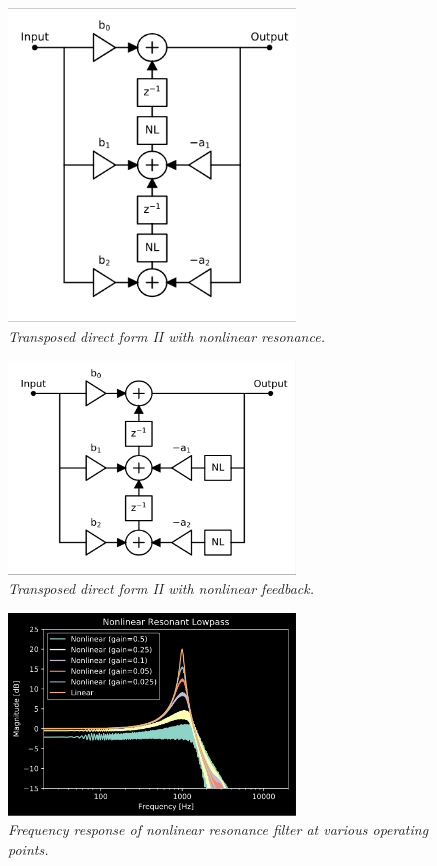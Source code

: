 \documentclass[twoside,a4paper]{article}
\begin{document}
%
\begin{figure}[!htb]
    \center
    \includegraphics[width=3in]{../NonlinearBiquad/Pics/NL-TDF-II-White.png}
    \caption{\label{nlbq}{\it Transposed direct form II with nonlinear resonance.}}
\end{figure}
%
\begin{figure}[!htb]
    \center
    \includegraphics[width=3in]{../NonlinearFeedback/Pics/NL2-TDF-II-White.png}
    \caption{\label{nlfd}{\it Transposed direct form II with nonlinear feedback.}}
\end{figure}
%
\begin{figure}[!htb]
    \center
    \includegraphics[width=3in]{../NonlinearBiquad/Pics/NL-LPF.png}
    \caption{\label{nlbq-lpf}{\it Frequency response of nonlinear resonance filter at
    various operating points.}}
\end{figure}
\end{document}
